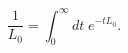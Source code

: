 \begin{equation}
\frac{1}{L_0}  = \int_0^\infty dt \;e^{-tL_0}.
\label{eq:Schwinger}
\end{equation}


